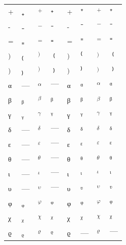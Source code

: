 \documentclass{standalone}
\begin{document}
\begin{tabular}{ll|ll|ll|ll}
\midrule
\textsubscript{+} & ₊ & $_{+}$ & $₊$ & \textsuperscript{+} & ⁺ & $^{+}$ & $⁺$ \\
\textsubscript{-} & ₋ & $_{-}$ & $₋$ & \textsuperscript{-} & ⁻ & $^{-}$ & $⁻$ \\
\textsubscript{=} & ₌ & $_{=}$ & $₌$ & \textsuperscript{=} & ⁼ & $^{=}$ & $⁼$ \\
\textsubscript{)} & ₍ & $_{)}$ & $₍$ & \textsuperscript{)} & ⁽ & $^{)}$ & $⁽$ \\
\textsubscript{)} & ₎ & $_{)}$ & $₎$ & \textsuperscript{)} & ⁾ & $^{)}$ & $⁾$ \\
\midrule
\textsubscript{α} & — & $_{α}$ & $—$ & \textsuperscript{α} & ᵅ & $^{α}$ & $ᵅ$ \\
\textsubscript{β} & ᵦ & $_{β}$ & $ᵦ$ & \textsuperscript{β} & ᵝ & $^{β}$ & $ᵝ$ \\
\textsubscript{γ} & ᵧ & $_{γ}$ & $ᵧ$ & \textsuperscript{γ} & ᵞ & $^{γ}$ & $ᵞ$ \\
\textsubscript{δ} & — & $_{δ}$ & $—$ & \textsuperscript{δ} & ᵟ & $^{δ}$ & $ᵟ$ \\
\textsubscript{ε} & — & $_{ε}$ & $—$ & \textsuperscript{ε} & ᵋ & $^{ε}$ & $ᵋ$ \\
\textsubscript{θ} & — & $_{θ}$ & $—$ & \textsuperscript{θ} & ᶿ & $^{θ}$ & $ᶿ$ \\
\textsubscript{ι} & — & $_{ι}$ & $—$ & \textsuperscript{ι} & ᶥ & $^{ι}$ & $ᶥ$ \\
\textsubscript{υ} & — & $_{υ}$ & $—$ & \textsuperscript{υ} & ᶹ & $^{υ}$ & $ᶹ$ \\
\textsubscript{φ} & ᵩ & $_{φ}$ & $ᵩ$ & \textsuperscript{φ} & ᵠ & $^{φ}$ & $ᵠ$ \\
\textsubscript{χ} & ᵪ & $_{χ}$ & $ᵪ$ & \textsuperscript{χ} & ᵡ & $^{χ}$ & $ᵡ$ \\
\textsubscript{ϱ} & ᵨ & $_{ϱ}$ & $ᵨ$ & \textsuperscript{ϱ} & — & $^{ϱ}$ & $—$ \\
\bottomrule
\end{tabular}
\end{document}
